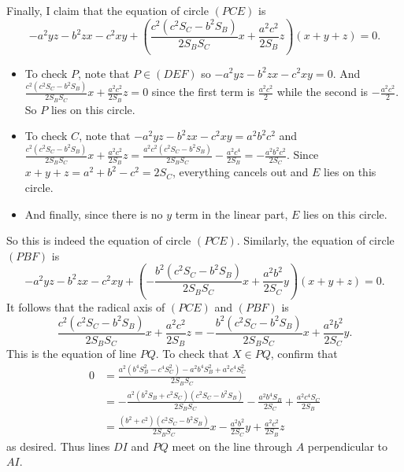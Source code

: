Finally, I claim that the equation of circle $(PCE)$ is \[-a^2yz-b^2zx-c^2xy+\left(\frac{c^2(c^2S_C-b^2S_B)}{2S_BS_C}x+\frac{a^2c^2}{2S_B}z\right)(x+y+z)=0.\]
\begin{itemize}
	\item To check $P$, note that $P\in(DEF)$ so $-a^2yz-b^2zx-c^2xy=0$. And $\frac{c^2(c^2S_C-b^2S_B)}{2S_BS_C}x+\frac{a^2c^2}{2S_B}z=0$ since the first term is $\frac{a^2c^2}{2}$ while the second is $-\frac{a^2c^2}{2}$. So $P$ lies on this circle.
	\item To check $C$, note that $-a^2yz-b^2zx-c^2xy=a^2b^2c^2$ and $\frac{c^2(c^2S_C-b^2S_B)}{2S_BS_C}x+\frac{a^2c^2}{2S_B}z=\frac{a^2c^2(c^2S_C-b^2S_B)}{2S_BS_C}-\frac{a^2c^4}{2S_B}=-\frac{a^2b^2c^2}{2S_C}$. Since $x+y+z=a^2+b^2-c^2=2S_C$, everything cancels out and $E$ lies on this circle.
	\item And finally, since there is no $y$ term in the linear part, $E$ lies on this circle.
\end{itemize}
So this is indeed the equation of circle $(PCE)$. Similarly, the equation of circle $(PBF)$ is \[-a^2yz-b^2zx-c^2xy+\left(-\frac{b^2(c^2S_C-b^2S_B)}{2S_BS_C}x+\frac{a^2b^2}{2S_C}y\right)(x+y+z)=0.\] It follows that the radical axis of $(PCE)$ and $(PBF)$ is \[\frac{c^2(c^2S_C-b^2S_B)}{2S_BS_C}x+\frac{a^2c^2}{2S_B}z=-\frac{b^2(c^2S_C-b^2S_B)}{2S_BS_C}x+\frac{a^2b^2}{2S_C}y.\] This is the equation of line $PQ$. To check that $X\in PQ$, confirm that
\begin{align*}
	0&=\frac{a^2(b^4S_B^2-c^4S_C^2)-a^2b^4S_B^2+a^2c^4S_C^2}{2S_BS_C}\\
	&=-\frac{a^2(b^2S_B+c^2S_C)(c^2S_C-b^2S_B)}{2S_BS_C}-\frac{a^2b^4S_B}{2S_C}+\frac{a^2c^4S_C}{2S_B}\\
	&=\frac{(b^2+c^2)(c^2S_C-b^2S_B)}{2S_BS_C}x-\frac{a^2b^2}{2S_C}y+\frac{a^2c^2}{2S_B}z
\end{align*}
as desired. Thus lines $DI$ and $PQ$ meet on the line through $A$ perpendicular to $AI$.